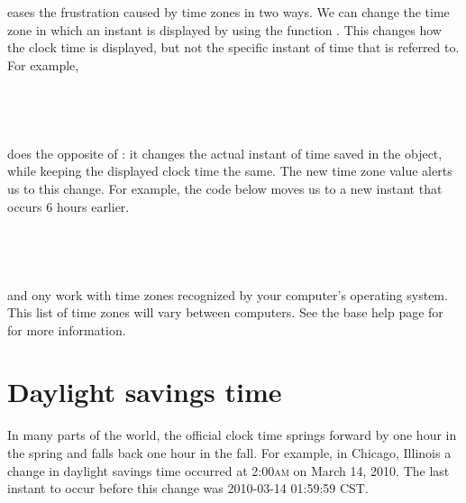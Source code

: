 \documentclass[article]{jss}
\begin{document}
 eases the frustration caused by time zones in two ways. We can change the time zone in which an instant is displayed by using the function . This changes how the clock time is displayed, but not the specific instant of time that is referred to. For example,\\

\\
\\
\\
\\

 does the opposite of : it changes the actual instant of time saved in the object, while keeping the displayed clock time the same. The new time zone value alerts us to this change. For example, the code below moves us to a new instant that occurs 6 hours earlier.\\

\\
\\
\\
\\

 and  ony work with time zones recognized by your computer's operating system. This list of time zones will vary between computers. See the base  help page for  for more information.

\section{Daylight savings time}
\label{sec:DST}

In many parts of the world, the official clock time springs forward by one hour in the spring and falls back one hour in the fall. For example, in Chicago, Illinois a change in daylight savings time occurred at 2:00\textsc{am} on March 14, 2010. The last instant to occur before this change was 2010-03-14 01:59:59 CST.\\

\\
\\
\\
\end{document}
